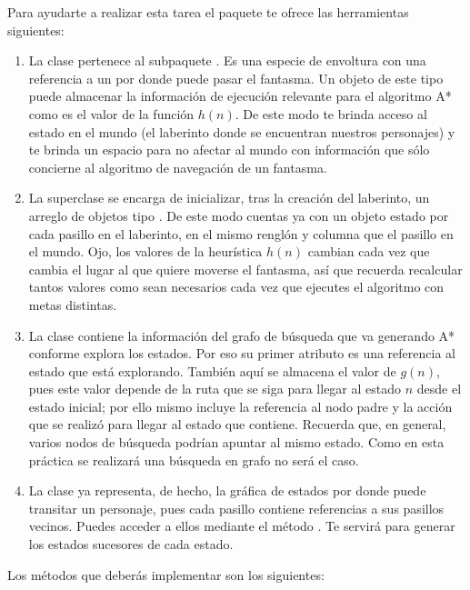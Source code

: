 Para ayudarte a realizar esta tarea el paquete te ofrece las herramientas siguientes:

\begin{enumerate}
 \item La clase  pertenece al subpaquete .  Es una especie de envoltura con una referencia a un  por donde puede pasar el fantasma.  Un objeto de este tipo puede almacenar la información de ejecución relevante para el algoritmo A* como es el valor de la función \(h(n)\).  De este modo te brinda acceso al estado en el mundo (el laberinto donde se encuentran nuestros personajes) y te brinda un espacio para no afectar al mundo con información que sólo concierne al algoritmo de navegación de un fantasma.
 
 \item La superclase  se encarga de inicializar, tras la creación del laberinto, un arreglo de objetos tipo .  De este modo cuentas ya con un objeto estado por cada pasillo en el laberinto, en el mismo renglón y columna que el pasillo en el mundo.  Ojo, los valores de la heurística $h(n)$ cambian cada vez que cambia el lugar al que quiere moverse el fantasma, así que recuerda recalcular tantos valores como sean necesarios cada vez que ejecutes el algoritmo con metas distintas.
 
 \item La clase  contiene la información del grafo de búsqueda que va generando A* conforme explora los estados.  Por eso su primer atributo es una referencia al estado que está explorando.  También aquí se almacena el valor de $g(n)$, pues este valor depende de la ruta que se siga para llegar al estado $n$ desde el estado inicial; por ello mismo incluye la referencia al nodo padre y la acción que se realizó para llegar al estado que contiene.  Recuerda que, en general, varios nodos de búsqueda podrían apuntar al mismo estado.  Como en esta práctica se realizará una búsqueda en grafo no será el caso.
 
 \item La clase  ya representa, de hecho, la gráfica de estados por donde puede transitar un personaje, pues cada pasillo contiene referencias a sus pasillos vecinos.  Puedes acceder a ellos mediante el método .  Te servirá para generar los estados sucesores de cada estado.
\end{enumerate}

Los métodos que deberás implementar son los siguientes:

